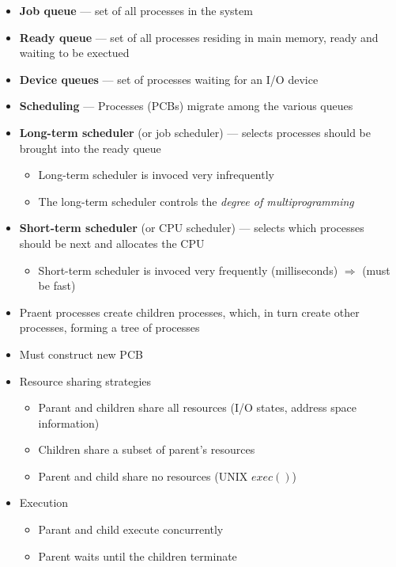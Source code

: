 \documentclass[titlepage]{article}
\begin{document}
  \begin{itemize}
    \item {\color{blue} \textbf{Job queue}} --- set of all processes in the system
    \item {\color{blue} \textbf{Ready queue}} --- set of all processes residing in main memory, ready and waiting to be exectued
    \item {\color{blue} \textbf{Device queues}} --- set of processes waiting for an I/O device
    \item {\color{blue} \textbf{Scheduling}} --- Processes (PCBs) migrate among the various queues
    \item {\color{blue} \textbf{Long-term scheduler}} (or job scheduler) --- selects processes should be brought into the ready queue
    \begin{itemize}
      \item Long-term scheduler is invoced very infrequently
      \item The long-term scheduler controls the \textit{degree of multiprogramming}
    \end{itemize}
    \item {\color{blue} \textbf{Short-term scheduler}} (or CPU scheduler) --- selects which processes should be next and allocates the CPU
    \begin{itemize}
      \item Short-term scheduler is invoced very frequently (milliseconds) $\Rightarrow$ (must be fast)
    \end{itemize}
    \item Praent processes create children processes, which, in turn create other processes, forming a tree of processes
    \item Must construct new PCB
    \item Resource sharing strategies
    \begin{itemize}
      \item Parant and children share all resources (I/O states, address space information)
      \item Children share a subset of parent's resources
      \item Parent and child share no resources (UNIX $exec()$)
    \end{itemize}
    \item Execution
    \begin{itemize}
      \item Parant and child execute concurrently
      \item Parent waits until the children terminate
    \end{itemize}
  \end{itemize}
\end{document}
